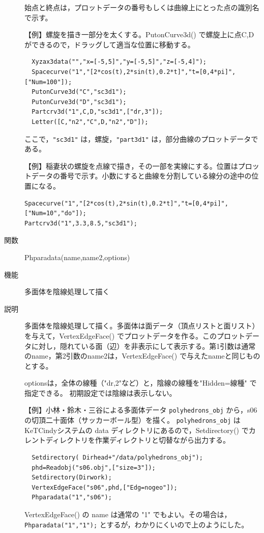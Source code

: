 \documentclass[papersize,a4paper,12pt,uplatex]{jsarticle}
\begin{document}
\begin{description}
始点と終点は，プロットデータの番号もしくは曲線上にとった点の識別名で示す。

\vspace{\baselineskip}
【例】螺旋を描き一部分を太くする。PutonCurve3d() で螺旋上に点C,Dができるので，ドラッグして適当な位置に移動する。
\begin{verbatim}
  Xyzax3data("","x=[-5,5]","y=[-5,5]","z=[-5,4]");
  Spacecurve("1","[2*cos(t),2*sin(t),0.2*t]","t=[0,4*pi]",["Num=100"]);
  PutonCurve3d("C","sc3d1");
  PutonCurve3d("D","sc3d1");
  Partcrv3d("1",C,D,"sc3d1",["dr,3"]);
  Letter([C,"n2","C",D,"n2","D"]);
\end{verbatim}
  ここで，\verb|"sc3d1"| は，螺旋，\verb|"part3d1"| は，部分曲線のプロットデータである。
  
\begin{center}  \end{center}

\vspace{\baselineskip}
【例】稲妻状の螺旋を点線で描き，その一部を実線にする。位置はプロットデータの番号で示す。小数にすると曲線を分割している線分の途中の位置になる。
\begin{verbatim}
Spacecurve("1","[2*cos(t),2*sin(t),0.2*t]","t=[0,4*pi]",["Num=10","do"]);
Partcrv3d("1",3.3,8.5,"sc3d1");
\end{verbatim}
              \begin{center}  \end{center}

\hypertarget{phparadata}{}
\item[関数]  Phparadata(name,name2,options)
\item[機能]  多面体を陰線処理して描く
\item[説明]  多面体を陰線処理して描く。多面体は面データ（頂点リストと面リスト）を与えて，VertexEdgeFace() でプロットデータを作る。このプロットデータに対し，隠れている面（辺）を非表示にして表示する。第1引数は通常のname，第2引数のname2は，VertexEdgeFace() で与えたnameと同じものとする。

  optionsは，全体の線種（"dr,2"など）と，陰線の線種を"Hidden=線種" で指定できる。 初期設定では陰線は表示しない。
  
\vspace{\baselineskip}
【例】小林・鈴木・三谷による多面体データ  \verb|polyhedrons_obj|  から，s06の切頂二十面体（サッカーボール型）を描く。 \verb|polyhedrons_obj| は KeTCindyシステムの data ディレクトリにあるので，Setdirectory() でカレントディレクトリを作業ディレクトリと切替ながら出力する。
\begin{verbatim}
  Setdirectory( Dirhead+"/data/polyhedrons_obj");
  phd=Readobj("s06.obj",["size=3"]);
  Setdirectory(Dirwork);
  VertexEdgeFace("s06",phd,["Edg=nogeo"]);
  Phparadata("1","s06");
\end{verbatim}
  VertexEdgeFace() の name は通常の "1" でもよい。その場合は，\verb|Phparadata("1","1");| とするが，わかりにくいので上のようにした。
  

\end{description}
\end{document}
